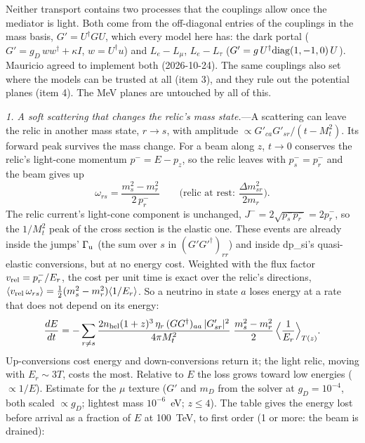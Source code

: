 \documentclass[11pt,a4paper]{article}
\newcommand{\gd}{g_D}
\begin{document}
Neither transport contains two processes that the couplings allow once the mediator is light. Both come from the
off-diagonal entries of the couplings in the mass basis, $G' = U^\dagger G U$, which every model here has: the dark
portal ($G' = \gd\,w w^\dagger + \kappa I$, $w = U^\dagger u$) and $L_e - L_\mu$, $L_e - L_\tau$
($G' = g\,U^\dagger{\rm diag}(1,-1,0)\,U$). Mauricio agreed to implement both (2026-10-24). The same couplings also set
where the models can be trusted at all (item 3), and they rule out the potential planes (item 4). The MeV planes are
untouched by all of this.

\textit{1. A soft scattering that changes the relic's mass state.}---A scattering can leave the relic in another
mass state, $r \to s$, with amplitude $\propto G'_{ca}G'_{sr}/(t - M_t^2)$. Its forward peak survives the mass
change. For a beam along $z$, $t \to 0$ conserves the relic's light-cone momentum $p^- = E - p_z$, so the relic
leaves with $p_s^- = p_r^-$ and the beam gives up
\begin{equation}
  \omega_{rs} = \frac{m_s^2 - m_r^2}{2\,p_r^-}
  \qquad\Big(\text{relic at rest: } \frac{\Delta m^2_{sr}}{2m_r}\Big).
\end{equation}
The relic current's light-cone component is unchanged, $J^- = 2\sqrt{p_s^-p_r^-} = 2p_r^-$, so the
$1/M_t^2$ peak of the cross section is the elastic one. These events are already inside the jumps' $\Gamma_{\rm u}$
(the sum over $s$ in $(G'G'^\dagger)_{rr}$) and inside dp\_si's quasi-elastic conversions, but at no energy cost.
Weighted with the flux factor $v_{\rm rel} = p_r^-/E_r$, the cost per unit time is exact over the relic's
directions, $\langle v_{\rm rel}\,\omega_{rs}\rangle = \frac12(m_s^2 - m_r^2)\langle 1/E_r\rangle$. So a
neutrino in state $a$ loses energy at a rate that does not depend on its energy:
\begin{equation}
  \frac{dE}{dt} = -\sum_{r\ne s} \frac{2n_{\rm hel}(1+z)^3\,\eta_r\,(GG^\dagger)_{aa}\,|G'_{sr}|^2}{4\pi M_t^2}\;
  \frac{m_s^2 - m_r^2}{2}\,\Big\langle\frac{1}{E_r}\Big\rangle_{T(z)} .
\end{equation}
Up-conversions cost energy and down-conversions return it; the light relic, moving with $E_r \sim 3T$, costs
the most. Relative to $E$ the loss grows toward low energies ($\propto 1/E$). Estimate for the $\mu$ texture
($G'$ and $m_D$ from the solver at $\gd = 10^{-4}$, both scaled $\propto\gd$; lightest mass $10^{-6}$~eV;
$z \le 4$). The table gives the energy lost before arrival as a fraction of $E$ at 100~TeV, to first order
(1 or more: the beam is drained):
\end{document}
